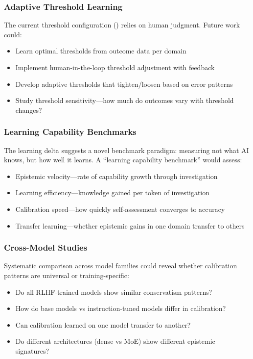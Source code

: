\subsubsection{Adaptive Threshold Learning}

The current threshold configuration () relies on human judgment. Future work could:

\begin{itemize}
    \item Learn optimal thresholds from outcome data per domain
    \item Implement human-in-the-loop threshold adjustment with feedback
    \item Develop adaptive thresholds that tighten/loosen based on error patterns
    \item Study threshold sensitivity---how much do outcomes vary with threshold changes?
\end{itemize}

\subsubsection{Learning Capability Benchmarks}

The learning delta suggests a novel benchmark paradigm: measuring not what AI knows, but how well it learns. A ``learning capability benchmark'' would assess:

\begin{itemize}
    \item Epistemic velocity---rate of capability growth through investigation
    \item Learning efficiency---knowledge gained per token of investigation
    \item Calibration speed---how quickly self-assessment converges to accuracy
    \item Transfer learning---whether epistemic gains in one domain transfer to others
\end{itemize}

\subsubsection{Cross-Model Studies}

Systematic comparison across model families could reveal whether calibration patterns are universal or training-specific:

\begin{itemize}
    \item Do all RLHF-trained models show similar conservatism patterns?
    \item How do base models vs instruction-tuned models differ in calibration?
    \item Can calibration learned on one model transfer to another?
    \item Do different architectures (dense vs MoE) show different epistemic signatures?
\end{itemize}


